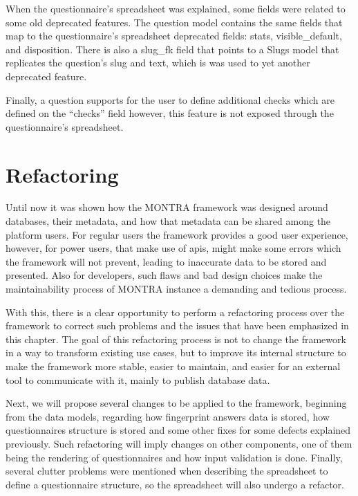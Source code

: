 When the questionnaire's spreadsheet was explained, some fields were related to some old deprecated features.
The question model contains the same fields that map to the questionnaire's spreadsheet deprecated fields: stats, visible\_default, and disposition.
There is also a slug\_fk field that points to a Slugs model that replicates the question's slug and text, which is was used to yet another deprecated feature.

Finally, a question supports for the user to define additional checks which are defined on the ``checks'' field however, this feature is not exposed through the questionnaire's spreadsheet.

\section{Refactoring}

Until now it was shown how the MONTRA framework was designed around databases, their metadata, and how that metadata can be shared among the platform users.
For regular users the framework provides a good user experience, however, for power users, that make use of \gls{api}s, might make some errors which the framework will not prevent, leading to inaccurate data to be stored and presented.
Also for developers, such flaws and bad design choices make the maintainability process of MONTRA instance a demanding and tedious process.

With this, there is a clear opportunity to perform a refactoring process over the framework to correct such problems and the issues that have been emphasized in this chapter.
The goal of this refactoring process is not to change the framework in a way to transform existing use cases, but to improve its internal structure to make the framework more stable, easier to maintain, and easier for an external tool to communicate with it, mainly to publish database data.

Next, we will propose several changes to be applied to the framework, beginning from the data models, regarding how fingerprint answers data is stored, how questionnaires structure is stored and some other fixes for some defects explained previously.
Such refactoring will imply changes on other components, one of them being the rendering of questionnaires and how input validation is done.
Finally, several clutter problems were mentioned when describing the spreadsheet to define a questionnaire structure, so the spreadsheet will also undergo a refactor.

